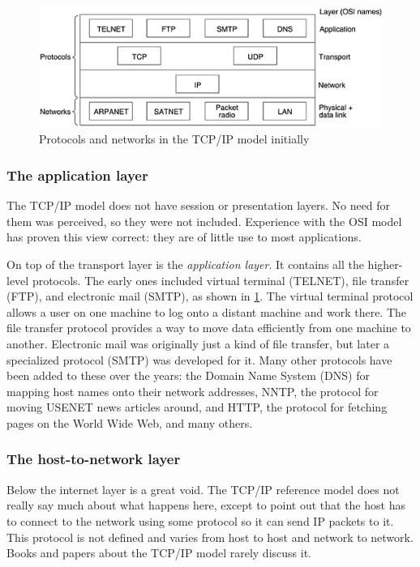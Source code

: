 \begin{figure}
   \centering
   \includegraphics[width=\textwidth]{images/01fig22.png}
   \caption{Protocols and networks in the TCP/IP model initially}
   \label{fig:tcpip-model-protocols}
\end{figure}



\subsubsection{The application layer}

The TCP/IP model does not have session or presentation layers. No need
for them was perceived, so they were not included. Experience with the
OSI model has proven this view correct: they are of little use to most
applications.

On top of the transport layer is the \emph{application layer}.
It contains all the higher-level protocols.
The early ones included virtual terminal (TELNET), file transfer (FTP), and electronic mail (SMTP), as shown in \cref{fig:tcpip-model-protocols}.
The virtual terminal protocol allows a user on one machine to log onto a distant machine and work there.
The file transfer protocol provides a way to move data efficiently from one machine to another.
Electronic mail was originally just a kind of file transfer, but later a specialized protocol (SMTP) was developed for it.
Many other protocols have been added to these over the years: the Domain Name System (DNS) for mapping host names onto their network addresses, NNTP, the protocol for moving USENET news articles around, and HTTP, the protocol for fetching pages on the World Wide Web, and many others.


\subsubsection{The host-to-network layer}

Below the internet layer is a great void. The TCP/IP reference model
does not really say much about what happens here, except to point out
that the host has to connect to the network using some protocol so it
can send IP packets to it. This protocol is not defined and varies from
host to host and network to network. Books and papers about the TCP/IP
model rarely discuss it.



